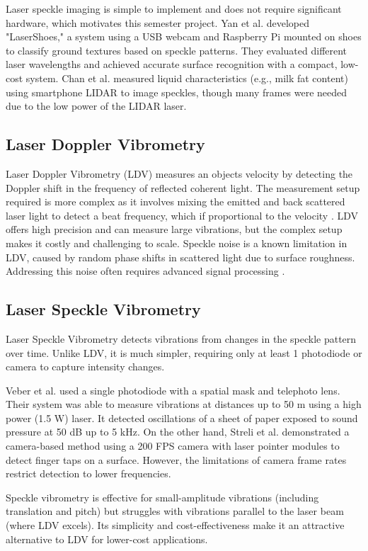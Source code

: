 Laser speckle imaging is simple to implement and does not require significant hardware, which motivates this semester project. Yan et al. \cite{lasershoes} developed "LaserShoes," a system using a USB webcam and Raspberry Pi mounted on shoes to classify ground textures based on speckle patterns. They evaluated different laser wavelengths and achieved accurate surface recognition with a compact, low-cost system. Chan et al. \cite{milkdrop} measured liquid characteristics (e.g., milk fat content) using smartphone LIDAR to image speckles, though many frames were needed due to the low power of the LIDAR laser.


\subsection{Laser Doppler Vibrometry}

Laser Doppler Vibrometry (LDV) measures an objects velocity by detecting the Doppler shift in the frequency of reflected coherent light. The measurement setup required is more complex as it involves mixing the emitted and back scattered laser light to detect a beat frequency, which if proportional to the velocity \cite{LDVreview}. LDV offers high precision and can measure large vibrations, but the complex setup makes it costly and challenging to scale. Speckle noise is a known limitation in LDV, caused by random phase shifts in scattered light due to surface roughness. Addressing this noise often requires advanced signal processing \cite{LDVreview}.

\subsection{Laser Speckle Vibrometry}

Laser Speckle Vibrometry detects vibrations from changes in the speckle pattern over time. Unlike LDV, it is much simpler, requiring only at least 1 photodiode or camera to capture intensity changes.

Veber et al. \cite{veber2011laserMASK} used a single photodiode with a spatial mask and telephoto lens. Their system was able to measure vibrations at distances up to 50 m using a high power (1.5 W) laser. It detected oscillations of a sheet of paper exposed to sound pressure at 50 dB up to 5 kHz. On the other hand, Streli et al. \cite{structured-light-speckle} demonstrated a camera-based method using a 200 FPS camera with laser pointer modules to detect finger taps on a surface. However, the limitations of camera frame rates restrict detection to lower frequencies.

Speckle vibrometry is effective for small-amplitude vibrations (including translation and pitch) but struggles with vibrations parallel to the laser beam (where LDV excels). Its simplicity and cost-effectiveness make it an attractive alternative to LDV for lower-cost applications.